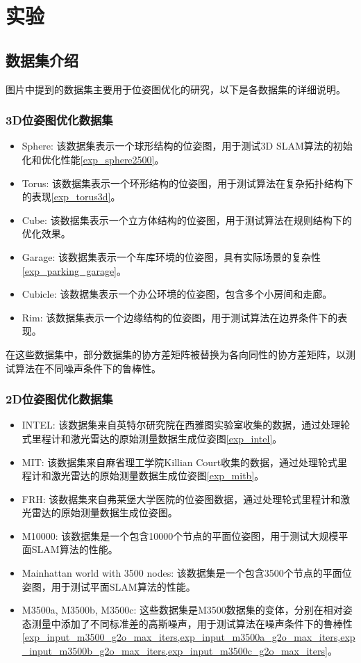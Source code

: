 \documentclass{ctexart}
\begin{document}
\section{实验}
\subsection{数据集介绍}

图片中提到的数据集主要用于位姿图优化的研究，以下是各数据集的详细说明。
\subsubsection{3D位姿图优化数据集\cite{carlone2015initialization, carlone2015lagrangian}}
\begin{itemize}
	\item Sphere: 该数据集表示一个球形结构的位姿图，用于测试3D SLAM算法的初始化和优化性能\ref{exp_sphere2500}。
	\item Torus: 该数据集表示一个环形结构的位姿图，用于测试算法在复杂拓扑结构下的表现\ref{exp_torus3d}。
	\item Cube: 该数据集表示一个立方体结构的位姿图，用于测试算法在规则结构下的优化效果。
	\item Garage: 该数据集表示一个车库环境的位姿图，具有实际场景的复杂性\ref{exp_parking_garage}。
	\item Cubicle: 该数据集表示一个办公环境的位姿图，包含多个小房间和走廊。
	\item Rim: 该数据集表示一个边缘结构的位姿图，用于测试算法在边界条件下的表现。
\end{itemize}

在这些数据集中，部分数据集的协方差矩阵被替换为各向同性的协方差矩阵，以测试算法在不同噪声条件下的鲁棒性。

\subsubsection{2D位姿图优化数据集\cite{carlone2014angular}}



\begin{itemize}
	\item INTEL: 该数据集来自英特尔研究院在西雅图实验室收集的数据，通过处理轮式里程计和激光雷达的原始测量数据生成位姿图\ref{exp_intel}。
	\item MIT: 该数据集来自麻省理工学院Killian Court收集的数据，通过处理轮式里程计和激光雷达的原始测量数据生成位姿图\ref{exp_mitb}。
	\item FRH: 该数据集来自弗莱堡大学医院的位姿图数据，通过处理轮式里程计和激光雷达的原始测量数据生成位姿图。
	\item M10000: 该数据集是一个包含10000个节点的平面位姿图，用于测试大规模平面SLAM算法的性能。
	\item Mainhattan world with 3500 nodes: 该数据集是一个包含3500个节点的平面位姿图，用于测试平面SLAM算法的性能。
	\item M3500a, M3500b, M3500c: 这些数据集是M3500数据集的变体，分别在相对姿态测量中添加了不同标准差的高斯噪声，用于测试算法在噪声条件下的鲁棒性\ref{exp_input_m3500_g2o_max_iters,exp_input_m3500a_g2o_max_iters,exp_input_m3500b_g2o_max_iters,exp_input_m3500c_g2o_max_iters}。
\end{itemize}
\end{document}
